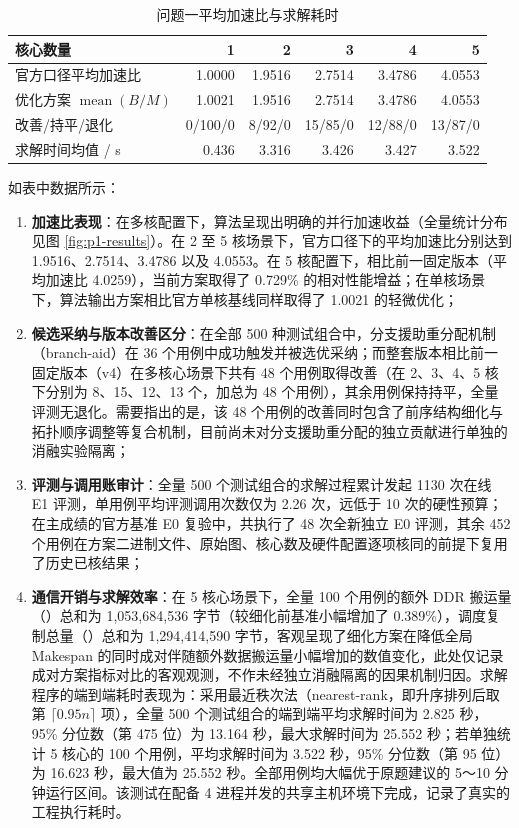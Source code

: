 \documentclass[anonymous,withtoc]{gmcm2026}
\providecommand{\tightlist}{\setlength{\itemsep}{0pt}\setlength{\parskip}{0pt}}
\begin{document}
\begin{table}[H]\centering
\caption{问题一平均加速比与求解耗时}\label{tab:p1-results}\normalsize

\begin{tabularx}{\linewidth}{@{}Xrrrrr@{}}\toprule
核心数量 & 1 & 2 & 3 & 4 & 5 \\
\midrule
官方口径平均加速比 & 1.0000 & 1.9516 & 2.7514 & 3.4786 & 4.0553 \\
优化方案 $\operatorname{mean}(B/M)$ & 1.0021 & 1.9516 & 2.7514 & 3.4786 & 4.0553 \\
改善/持平/退化 & 0/100/0 & 8/92/0 & 15/85/0 & 12/88/0 & 13/87/0 \\
求解时间均值 / s & 0.436 & 3.316 & 3.426 & 3.427 & 3.522 \\
\bottomrule\end{tabularx}\end{table}

如表中数据所示：

\begin{enumerate}
\def\labelenumi{\arabic{enumi}.}
\tightlist
\item
  \textbf{加速比表现}：在多核配置下，算法呈现出明确的并行加速收益（全量统计分布见图 \ref{fig:p1-results}）。在 2 至 5 核场景下，官方口径下的平均加速比分别达到 1.9516、2.7514、3.4786 以及 4.0553。在 5 核配置下，相比前一固定版本（平均加速比 4.0259），当前方案取得了 0.729\% 的相对性能增益；在单核场景下，算法输出方案相比官方单核基线同样取得了 1.0021 的轻微优化；
\item
  \textbf{候选采纳与版本改善区分}：在全部 500 种测试组合中，分支援助重分配机制（branch-aid）在 36 个用例中成功触发并被选优采纳；而整套版本相比前一固定版本（v4）在多核心场景下共有 48 个用例取得改善（在 2、3、4、5 核下分别为 8、15、12、13 个，加总为 48 个用例），其余用例保持持平，全量评测无退化。需要指出的是，该 48 个用例的改善同时包含了前序结构细化与拓扑顺序调整等复合机制，目前尚未对分支援助重分配的独立贡献进行单独的消融实验隔离；
\item
  \textbf{评测与调用账审计}：全量 500 个测试组合的求解过程累计发起 1130 次在线 E1 评测，单用例平均评测调用次数仅为 2.26 次，远低于 10 次的硬性预算；在主成绩的官方基准 E0 复验中，共执行了 48 次全新独立 E0 评测，其余 452 个用例在方案二进制文件、原始图、核心数及硬件配置逐项核同的前提下复用了历史已核结果；
\item
  \textbf{通信开销与求解效率}：在 5 核心场景下，全量 100 个用例的额外 DDR 搬运量（\texttt{}）总和为 1,053,684,536 字节（较细化前基准小幅增加了 0.389\%），调度复制总量（\texttt{}）总和为 1,294,414,590 字节，客观呈现了细化方案在降低全局 Makespan 的同时成对伴随额外数据搬运量小幅增加的数值变化，此处仅记录成对方案指标对比的客观观测，不作未经独立消融隔离的因果机制归因。求解程序的端到端耗时表现为：采用最近秩次法（nearest-rank，即升序排列后取第 \(\lceil 0.95n \rceil\) 项），全量 500 个测试组合的端到端平均求解时间为 2.825 秒，95\% 分位数（第 475 位）为 13.164 秒，最大求解时间为 25.552 秒；若单独统计 5 核心的 100 个用例，平均求解时间为 3.522 秒，95\% 分位数（第 95 位）为 16.623 秒，最大值为 25.552 秒。全部用例均大幅优于原题建议的 5～10 分钟运行区间。该测试在配备 4 进程并发的共享主机环境下完成，记录了真实的工程执行耗时。
\end{enumerate}
\end{document}
